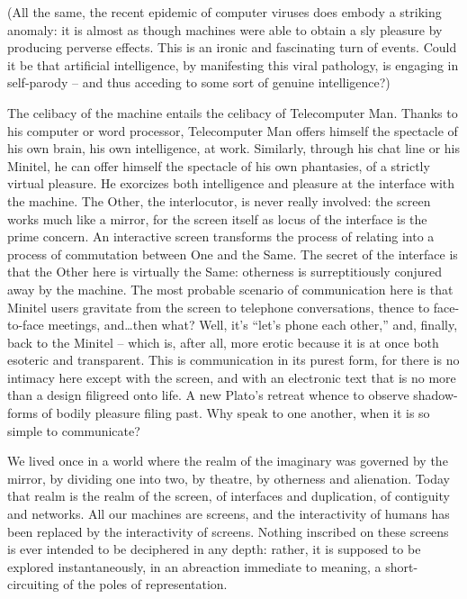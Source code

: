 \documentclass[10pt,twoside,openleft]{memoir}
\begin{document}
(All the same, the recent epidemic of computer viruses does embody a striking anomaly: it is almost as though machines were able to obtain a sly pleasure by producing perverse effects. This is an ironic and fascinating turn of events. Could it be that artificial intelligence, by manifesting this viral pathology, is engaging in self-parody -- and thus acceding to some sort of genuine intelligence?)

The celibacy of the machine entails the celibacy of Telecomputer Man. Thanks to his computer or word processor, Telecomputer Man offers himself the spectacle of his own brain, his own intelligence, at work. Similarly, through his chat line or his Minitel, he can offer himself the spectacle of his own phantasies, of a strictly virtual pleasure. He exorcizes both intelligence and pleasure at the interface with the machine. The Other, the interlocutor, is never really involved: the screen works much like a mirror, for the screen itself as locus of the interface is the prime concern. An interactive screen transforms the process of relating into a process of commutation between One and the Same. The secret of the interface is that the Other here is virtually the Same: otherness is surreptitiously conjured away by the machine. The most probable scenario of communication here is that Minitel users gravitate from the screen to telephone conversations, thence to face-to-face meetings, and\dots then what? Well, it's ``let's phone each other,'' and, finally, back to the Minitel -- which is, after all, more erotic because it is at once both esoteric and transparent. This is communication in its purest form, for there is no intimacy here except with the screen, and with an electronic text that is no more than a design filigreed onto life. A new Plato's retreat whence to observe shadow-forms of bodily pleasure filing past. Why speak to one another, when it is so simple to communicate?

We lived once in a world where the realm of the imaginary was governed by the mirror, by dividing one into two, by theatre, by otherness and alienation. Today that realm is the realm of the screen, of interfaces and duplication, of contiguity and networks. All our machines are screens, and the interactivity of humans has been replaced by the interactivity of screens. Nothing inscribed on these screens is ever intended to be deciphered in any depth: rather, it is supposed to be explored instantaneously, in an abreaction immediate to meaning, a short-circuiting of the poles of representation.
\end{document}
